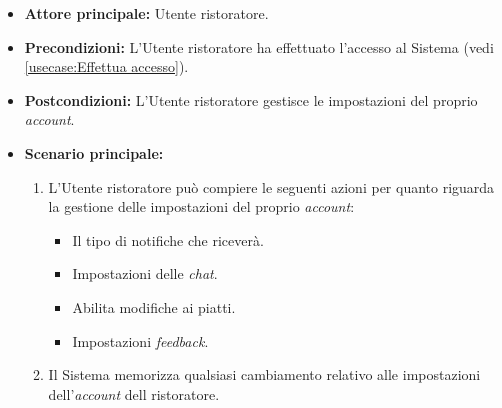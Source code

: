 \label{usecase:Impostazioni account ristoratore}
\begin{itemize}
	\item \textbf{Attore principale:} Utente ristoratore.

	\item \textbf{Precondizioni:} L'Utente ristoratore ha effettuato l'accesso al Sistema (vedi \autoref{usecase:Effettua accesso}).

	\item \textbf{Postcondizioni:} L'Utente ristoratore gestisce le impostazioni del proprio \textit{account}.


	\item \textbf{Scenario principale:}
	      \begin{enumerate}

		      \item L'Utente ristoratore può compiere le seguenti azioni per quanto riguarda la gestione delle impostazioni del proprio \textit{account}:
		      \begin{itemize}
                \item Il tipo di notifiche che riceverà.
                \item Impostazioni delle \textit{chat}.
                \item Abilita modifiche ai piatti.
                \item Impostazioni \textit{feedback}.
              \end{itemize}
              \item Il Sistema memorizza qualsiasi cambiamento relativo alle impostazioni dell'\textit{account} dell ristoratore.
	      \end{enumerate}
\end{itemize}